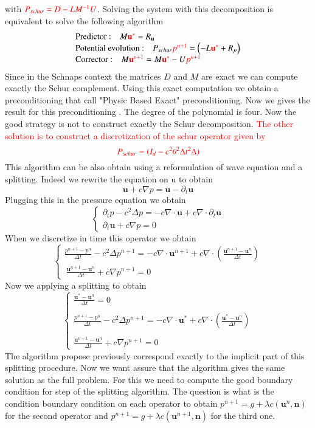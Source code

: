 \documentclass[a4paper,twoside,french,english,11pt]{article}
\newcommand{\ds}{\displaystyle}
\newcommand{\dt}{\partial_t}
\begin{document}
with $\textcolor{red}{P_{schur}=D-LM^{-1}U}$. Solving the system with this decomposition is equivalent to solve the following algorithm 
$$
\left.\begin{array}{l}
\mbox{Predictor :\quad} M \textcolor{red}{\mathbf{u}^*}=R_{\mathbf{u}}\\
\mbox{Potential evolution :\quad} P_{schur}\textcolor{red}{p^{n+1}}=\left(-L\textcolor{red}{\mathbf{u}^*}+R_{p}\right)\\
\mbox{Corrector :\quad}  M\textcolor{red}{\mathbf{u}^{n+1}}=M\textcolor{red}{\mathbf{u}^*}-U\textcolor{red}{p^{n+1}}\end{array}\right.
$$
Since in the Schnaps context the matrices $D$ and $M$ are exact we can compute exactly the Schur complement. Using this exact computation we obtain a preconditioning that call "Physic Based Exact" preconditioning. Now we gives the result for this preconditioning . The degree of the polynomial is four.
Now the good strategy is not to construct exactly the Schur decomposition. \textcolor{red}{The other solution is to construct a discretization of the schur operator given by}
$$
\displaystyle \textcolor{red}{P_{schur}=(I_d-c^2\theta^2 \Delta t^2 \Delta )}
$$
This algorithm can be also obtain using a reformulation of wave equation and a splitting. Indeed we rewrite the equation on u to obtain
$$
\bm{u}+c\nabla p=\bm{u}-\dt \bm{u}
$$
Plugging this in the pressure equation we obtain
$$
\left\{\begin{array}{l}
\ds \dt p- c^2\Delta  p=-c\nabla \cdot \bm{u}+ c\nabla \cdot \dt \bm{u}\\
\ds \dt \bm{u}+c\nabla p = 0 \end{array}\right.
$$
When we discretize in time this operator we obtain
$$
\left\{\begin{array}{l}
\ds \frac{p^{n+1}-p^n}{\Delta t}- c^2\Delta  p^{n+1}=-c\nabla \cdot \bm{u}^{n+1}+ c\nabla \cdot \left(\frac{\bm{u}^{n+1}-\bm{u}^n}{\Delta t}\right)\\\
\ds \frac{\bm{u}^{n+1}-\bm{u}^n}{\Delta t} +c\nabla p^{n+1} = 0 \end{array}\right.
$$
Now we applying a splitting to obtain
$$
\left\{\begin{array}{l}
\ds \frac{\bm{u}^{*}-\bm{u}^n}{\Delta t}  = 0\\
~\\
\ds \frac{p^{n+1}-p^n}{\Delta t}- c^2\Delta  p^{n+1}=-c\nabla \cdot \bm{u}^{*}+ c\nabla \cdot \left(\frac{\bm{u}^{*}-\bm{u}^n}{\Delta t}\right)\\
~\\
\ds \frac{\bm{u}^{n+1}-\bm{u}^n}{\Delta t} +c\nabla p^{n+1} = 0 \end{array}\right.
$$
The algorithm propose previously correspond exactly to the implicit part of this splitting procedure. Now we want assure that the algorithm gives the same solution as the full problem. For this we need to compute the good boundary condition for step of the splitting algorithm. The question is what is the condition boundary condition on each operator to obtain $p^{n+1}=g+\lambda c (\bm{u}^n,\bm{n})$ for the second operator and $p^{n+1}=g+\lambda c (\bm{u}^{n+1},\bm{n})$ for the third one. 
\end{document}
